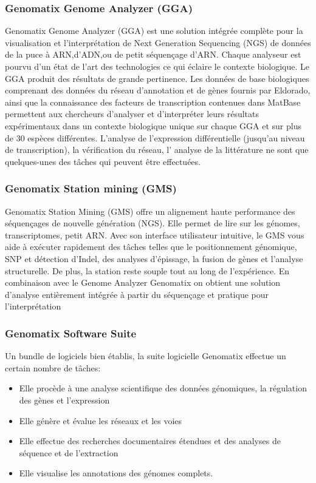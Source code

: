 \subsubsection{Genomatix Genome Analyzer (GGA)}
Genomatix Genome Analyzer (GGA) est une solution intégrée complète pour la visualisation et l'interprétation de Next Generation Sequencing (NGS) de données de la puce à ARN,d'ADN,ou de petit séquençage d'ARN. Chaque analyseur est pourvu d'un état de l'art des technologies ce qui éclaire le contexte biologique. Le GGA produit des résultats de grande pertinence. Les données de base biologiques comprenant des données du réseau d'annotation et de gènes fournis par Eldorado, ainsi que la connaissance des facteurs de transcription contenues dans MatBase permettent aux chercheurs d'analyser et d'interpréter leurs résultats expérimentaux dans un contexte biologique unique sur chaque GGA et sur plus de 30 espèces différentes. L'analyse de l'expression différentielle (jusqu'au niveau de transcription), la vérification du réseau, l' analyse de la littérature ne sont que quelques-unes des tâches qui peuvent être effectuées.
\subsubsection{Genomatix Station mining (GMS)}
Genomatix Station Mining (GMS) offre un alignement haute performance des séquençages de nouvelle génération (NGS). 
Elle permet de lire sur les génomes, transcriptomes, petit ARN. Avec son interface utilisateur intuitive, le GMS vous aide à exécuter rapidement des tâches telles que le positionnement génomique, SNP et détection d'Indel, des analyses d'épissage, la fusion de gènes et l'analyse structurelle. De plus, la station reste souple tout au long de l'expérience. En combinaison avec le Genome Analyzer Genomatix on obtient une solution d'analyse entièrement intégrée à partir du séquençage et pratique pour l'interprétation
\subsubsection{Genomatix Software Suite}
Un bundle de logiciels bien établis, la suite logicielle Genomatix effectue un certain nombre de tâches:
\begin{itemize}
\item{Elle procède à une analyse scientifique des données génomiques, la régulation des gènes et l'expression}
\item{Elle génère et évalue les réseaux et les voies}
\item{Elle effectue des recherches documentaires étendues et des analyses de séquence et de l'extraction}
\item{Elle visualise les annotations des génomes complets.}
\end{itemize}

